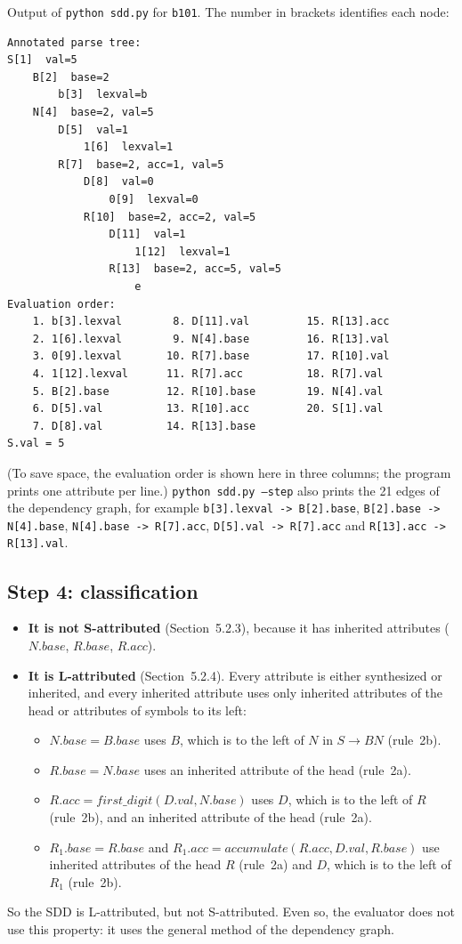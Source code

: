 \documentclass[11pt,a4paper]{article}
\newcommand{\code}[1]{\texttt{#1}}
\begin{document}
\medskip
\noindent Output of \code{python sdd.py} for \code{b101}. The number in brackets identifies each node:
\begin{lstlisting}
Annotated parse tree:
S[1]  val=5
    B[2]  base=2
        b[3]  lexval=b
    N[4]  base=2, val=5
        D[5]  val=1
            1[6]  lexval=1
        R[7]  base=2, acc=1, val=5
            D[8]  val=0
                0[9]  lexval=0
            R[10]  base=2, acc=2, val=5
                D[11]  val=1
                    1[12]  lexval=1
                R[13]  base=2, acc=5, val=5
                    e
Evaluation order:
    1. b[3].lexval        8. D[11].val         15. R[13].acc
    2. 1[6].lexval        9. N[4].base         16. R[13].val
    3. 0[9].lexval       10. R[7].base         17. R[10].val
    4. 1[12].lexval      11. R[7].acc          18. R[7].val
    5. B[2].base         12. R[10].base        19. N[4].val
    6. D[5].val          13. R[10].acc         20. S[1].val
    7. D[8].val          14. R[13].base
S.val = 5
\end{lstlisting}
(To save space, the evaluation order is shown here in three columns; the program prints one attribute per line.)
\code{python sdd.py --step} also prints the 21 edges of the dependency graph, for example
\code{b[3].lexval -> B[2].base}, \code{B[2].base -> N[4].base}, \code{N[4].base -> R[7].acc},
\code{D[5].val -> R[7].acc} and \code{R[13].acc -> R[13].val}.

\subsection{Step 4: classification}

\begin{itemize}
  \item \textbf{It is not S-attributed} (Section~5.2.3), because it has inherited attributes ($N.base$, $R.base$, $R.acc$).
  \item \textbf{It is L-attributed} (Section~5.2.4). Every attribute is either synthesized or inherited, and every inherited attribute uses only inherited attributes of the head or attributes of symbols to its left:
  \begin{itemize}
    \item $N.base = B.base$ uses $B$, which is to the left of $N$ in $S \to BN$ (rule~2b).
    \item $R.base = N.base$ uses an inherited attribute of the head (rule~2a).
    \item $R.acc = first\_digit(D.val, N.base)$ uses $D$, which is to the left of $R$ (rule~2b), and an inherited attribute of the head (rule~2a).
    \item $R_1.base = R.base$ and $R_1.acc = accumulate(R.acc, D.val, R.base)$ use inherited attributes of the head $R$ (rule~2a) and $D$, which is to the left of $R_1$ (rule~2b).
  \end{itemize}
\end{itemize}
So the SDD is L-attributed, but not S-attributed. Even so, the evaluator does not use this property: it uses the general method of the dependency graph.
\end{document}
